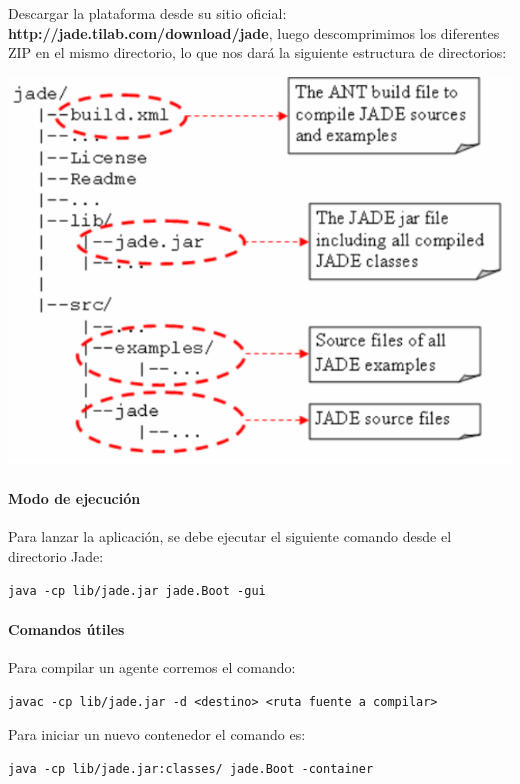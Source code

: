 \documentclass[11pt]{extarticle}
\begin{document}
    Descargar la plataforma desde su sitio oficial:
\textbf{http://jade.tilab.com/download/jade}, luego descomprimimos los
diferentes ZIP en el mismo directorio, lo que nos dará la siguiente
estructura de directorios:

\includegraphics{images/jade.png}

\hypertarget{modo-de-ejecuciuxf3n}{%
\paragraph{Modo de ejecución}\label{modo-de-ejecuciuxf3n}}

Para lanzar la aplicación, se debe ejecutar el siguiente comando desde
el directorio Jade:

\begin{verbatim}
java -cp lib/jade.jar jade.Boot -gui
\end{verbatim}

\hypertarget{comandos-uxfatiles}{%
\paragraph{Comandos útiles}\label{comandos-uxfatiles}}

Para compilar un agente corremos el comando:

\begin{verbatim}
javac -cp lib/jade.jar -d <destino> <ruta fuente a compilar>
\end{verbatim}

Para iniciar un nuevo contenedor el comando es:

\begin{verbatim}
java -cp lib/jade.jar:classes/ jade.Boot -container
\end{verbatim}
\end{document}
